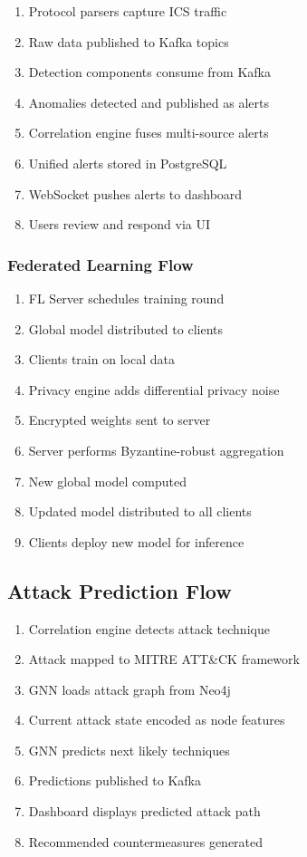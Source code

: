 \documentclass[12pt,a4paper]{article}
\begin{document}
\begin{enumerate}[leftmargin=1cm,itemsep=0pt]
    \item Protocol parsers capture ICS traffic
    \item Raw data published to Kafka topics
    \item Detection components consume from Kafka
    \item Anomalies detected and published as alerts
    \item Correlation engine fuses multi-source alerts
    \item Unified alerts stored in PostgreSQL
    \item WebSocket pushes alerts to dashboard
    \item Users review and respond via UI
\end{enumerate}

\subsubsection{Federated Learning Flow}

\begin{enumerate}[leftmargin=1cm,itemsep=0pt]
    \item FL Server schedules training round
    \item Global model distributed to clients
    \item Clients train on local data
    \item Privacy engine adds differential privacy noise
    \item Encrypted weights sent to server
    \item Server performs Byzantine-robust aggregation
    \item New global model computed
    \item Updated model distributed to all clients
    \item Clients deploy new model for inference
\end{enumerate}


\subsection{Attack Prediction Flow}

\begin{enumerate}[leftmargin=1cm,itemsep=0pt]
    \item Correlation engine detects attack technique
    \item Attack mapped to MITRE ATT\&CK framework
    \item GNN loads attack graph from Neo4j
    \item Current attack state encoded as node features
    \item GNN predicts next likely techniques
    \item Predictions published to Kafka
    \item Dashboard displays predicted attack path
    \item Recommended countermeasures generated
\end{enumerate}
\end{document}
